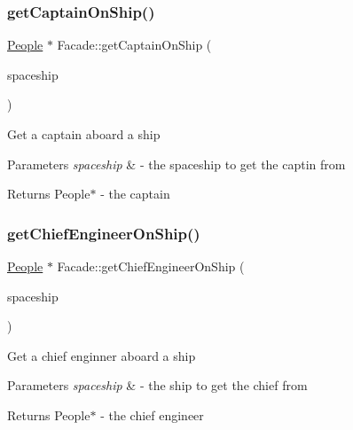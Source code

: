 \subsubsection{\texorpdfstring{get\+Captain\+On\+Ship()}{getCaptainOnShip()}}
{\footnotesize\ttfamily \hyperlink{classPeople}{People} $\ast$ Facade\+::get\+Captain\+On\+Ship (\begin{DoxyParamCaption}\item[{\hyperlink{classSpaceship}{Spaceship} $\ast$}]{spaceship }\end{DoxyParamCaption})}

Get a captain aboard a ship 
\begin{DoxyParams}{Parameters}
{\em spaceship} & -\/ the spaceship to get the captin from \\
\hline
\end{DoxyParams}
\begin{DoxyReturn}{Returns}
People$\ast$ -\/ the captain 
\end{DoxyReturn}
\mbox{\label{classFacade_af607a431f6654f447620a47f6373ded3}} 
\subsubsection{\texorpdfstring{get\+Chief\+Engineer\+On\+Ship()}{getChiefEngineerOnShip()}}
{\footnotesize\ttfamily \hyperlink{classPeople}{People} $\ast$ Facade\+::get\+Chief\+Engineer\+On\+Ship (\begin{DoxyParamCaption}\item[{\hyperlink{classSpaceship}{Spaceship} $\ast$}]{spaceship }\end{DoxyParamCaption})}

Get a chief enginner aboard a ship 
\begin{DoxyParams}{Parameters}
{\em spaceship} & -\/ the ship to get the chief from \\
\hline
\end{DoxyParams}
\begin{DoxyReturn}{Returns}
People$\ast$ -\/ the chief engineer 
\end{DoxyReturn}
\mbox{\label{classFacade_a3a5f6c00871cd14664a1f4ef1376bb9d}} 
